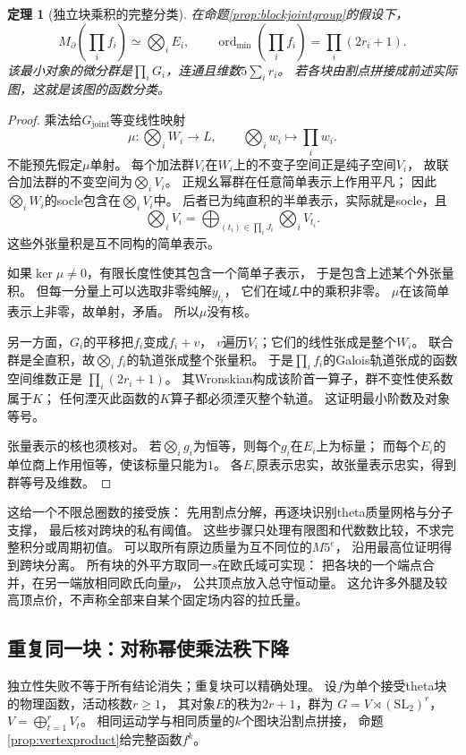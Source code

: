 \documentclass[11pt,a4paper]{ctexart}
\theoremstyle{cnplain}\newtheorem{theorem}{定理}[section]
\theoremstyle{definition}\newtheorem{definition}[theorem]{定义}
\theoremstyle{remark}\newtheorem{remark}[theorem]{注}
\begin{document}
\begin{theorem}[独立块乘积的完整分类]\label{thm:blockproductminimal}
在命题\ref{prop:blockjointgroup}的假设下，
\[
 M_\partial\left(\prod_i f_i\right)\simeq\bigotimes_i E_i,\qquad
 \operatorname{ord}_{\min}\left(\prod_i f_i\right)
       =\prod_i(2r_i+1).
\]
该最小对象的微分群是$\prod_iG_i$，连通且维数$5\sum_i r_i$。
若各块由割点拼接成前述实际图，这就是该图的函数分类。
\end{theorem}
\begin{proof}
乘法给$G_{\mathrm{joint}}$等变线性映射
\[
 \mu:\bigotimes_iW_i\longrightarrow L,\qquad
 \bigotimes_iw_i\longmapsto\prod_iw_i .
\]
不能预先假定$\mu$单射。
每个加法群$V_i$在$W_i$上的不变子空间正是纯子空间$V_i$，
故联合加法群的不变空间为$\bigotimes_iV_i$。
正规幺幂群在任意简单表示上作用平凡；
因此$\bigotimes_iW_i$的socle包含在$\bigotimes_iV_i$中。
后者已为纯直积的半单表示，实际就是socle，且
\[
 \bigotimes_iV_i=
 \bigoplus_{(t_i)\in\prod_iJ_i}\bigotimes_iV_{t_i}.
\]
这些外张量积是互不同构的简单表示。

如果$\ker\mu\ne0$，有限长度性使其包含一个简单子表示，
于是包含上述某个外张量积。
但每一分量上可以选取非零纯解$y_{t_i}$，
它们在域$L$中的乘积非零。
$\mu$在该简单表示上非零，故单射，矛盾。
所以$\mu$没有核。

另一方面，$G_i$的平移把$f_i$变成$f_i+v$，
$v$遍历$V_i$；它们的线性张成是整个$W_i$。
联合群是全直积，故$\bigotimes_if_i$的轨道张成整个张量积。
于是$\prod_i f_i$的Galois轨道张成的函数空间维数正是
$\prod_i(2r_i+1)$。
其Wronskian构成该阶首一算子，群不变性使系数属于$K$；
任何湮灭此函数的$K$算子都必须湮灭整个轨道。
这证明最小阶数及对象等号。

张量表示的核也须核对。
若$\bigotimes_i g_i$为恒等，则每个$g_i$在$E_i$上为标量；
而每个$E_i$的单位商上作用恒等，使该标量只能为$1$。
各$E_i$原表示忠实，故张量表示忠实，得到群等号及维数。
\end{proof}

这给一个不限总圈数的接受族：
先用割点分解，再逐块识别theta质量网格与分子支撑，
最后核对跨块的私有阈值。
这些步骤只处理有限图和代数数比较，不求完整积分或周期初值。
可以取所有原边质量为互不同位的$M5^e$，
沿用最高位证明得到跨块分离。
所有块的外平方取同一$s$在欧氏域可实现：
把各块的一个端点合并，在另一端放相同欧氏向量$p$，
公共顶点放入总守恒动量。
这允许多外腿及较高顶点价，不声称全部来自某个固定场内容的拉氏量。

\subsection{重复同一块：对称幂使乘法秩下降}
独立性失败不等于所有结论消失；重复块可以精确处理。
设$f$为单个接受theta块的物理函数，活动核数$r\ge1$，
其对象$E$的秩为$2r+1$，群为
$G=V\rtimes(\mathrm{SL}_2)^r$，$V=\bigoplus_{t=1}^rV_t$。
相同运动学与相同质量的$k$个图块沿割点拼接，
命题\ref{prop:vertexproduct}给完整函数$f^k$。
\end{document}
